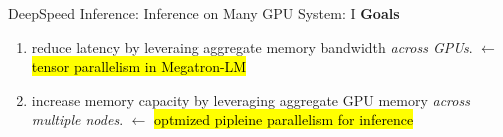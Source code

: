 \begin{frame}{DeepSpeed Inference: Inference on Many GPU System: I}
    \center\textbf{Goals}
    \begin{enumerate}
        \item reduce latency by leveraing aggregate memory bandwidth \textcolor{byzantium}{\textit{across GPUs}}. $\leftarrow$ \hl{tensor parallelism in Megatron-LM}
        \item increase memory capacity by leveraging aggregate GPU memory \textcolor{byzantium}{\textit{across multiple nodes}}. $\leftarrow$ \hl{optmized pipleine parallelism for inference}
    \end{enumerate}
    \begin{figure}
    \end{figure}
\end{frame}


